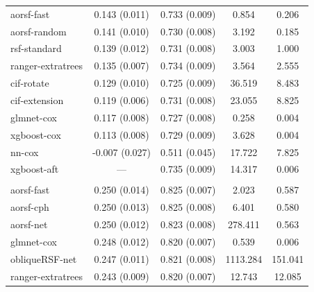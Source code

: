 \documentclass{article}\usepackage[]{graphicx}\usepackage[]{xcolor}
\newenvironment{knitrout}{}{} %
\begin{document}
\begin{knitrout}
\begin{longtable}[t]{lcccc}
\hspace{1em}aorsf-fast & 0.143 (0.011) & 0.733 (0.009) & 0.854 & 0.206\\
\hspace{1em}aorsf-random & 0.141 (0.010) & 0.730 (0.008) & 3.192 & 0.185\\
\hspace{1em}rsf-standard & 0.139 (0.012) & 0.731 (0.008) & 3.003 & 1.000\\
\hspace{1em}ranger-extratrees & 0.135 (0.007) & 0.734 (0.009) & 3.564 & 2.555\\
\hspace{1em}cif-rotate & 0.129 (0.010) & 0.725 (0.009) & 36.519 & 8.483\\
\hspace{1em}cif-extension & 0.119 (0.006) & 0.731 (0.008) & 23.055 & 8.825\\
\hspace{1em}glmnet-cox & 0.117 (0.008) & 0.727 (0.008) & 0.258 & 0.004\\
\hspace{1em}xgboost-cox & 0.113 (0.008) & 0.729 (0.009) & 3.628 & 0.004\\
\hspace{1em}nn-cox & -0.007 (0.027) & 0.511 (0.045) & 17.722 & 7.825\\
\hspace{1em}xgboost-aft & --- & 0.735 (0.009) & 14.317 & 0.006\\
\addlinespace[0.3em]
\multicolumn{5}{l}{\textit{\textbf{Serum free light chain; death, n = 7874, p = 10}}}\\
\hline
\hspace{1em}aorsf-fast & 0.250 (0.014) & 0.825 (0.007) & 2.023 & 0.587\\
\hspace{1em}aorsf-cph & 0.250 (0.013) & 0.825 (0.008) & 6.401 & 0.580\\
\hspace{1em}aorsf-net & 0.250 (0.012) & 0.823 (0.008) & 278.411 & 0.563\\
\hspace{1em}glmnet-cox & 0.248 (0.012) & 0.820 (0.007) & 0.539 & 0.006\\
\hspace{1em}obliqueRSF-net & 0.247 (0.011) & 0.821 (0.008) & 1113.284 & 151.041\\
\hspace{1em}ranger-extratrees & 0.243 (0.009) & 0.820 (0.007) & 12.743 & 12.085\\

\end{longtable}
\end{knitrout}
\end{document}

